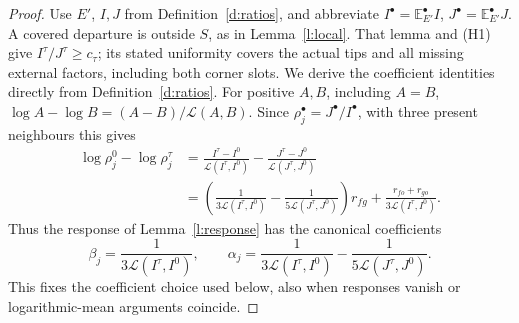 \begin{proof}
Use \(E'\), \(I,J\) from Definition~\ref{d:ratios}, and abbreviate
\(I^\bullet=\mathbb E_{E'}^\bullet I\),
\(J^\bullet=\mathbb E_{E'}^\bullet J\).  A covered departure is
outside \(S\), as in Lemma~\ref{l:local}.  That lemma and (H1)
give \(I^\tau/J^\tau\ge c_\tau\); its stated uniformity covers
the actual tips and all missing external factors, including both
corner slots.  We derive the coefficient identities directly from
Definition~\ref{d:ratios}.  For positive \(A,B\), including
\(A=B\),
\(\log A-\log B=(A-B)/\mathcal L(A,B)\).  Since
\(\rho_j^\bullet=J^\bullet/I^\bullet\), with three present
neighbours this gives
\[
 \begin{split}
 \log\rho_j^0-\log\rho_j^\tau
 &=\frac{I^\tau-I^0}{\mathcal L(I^\tau,I^0)}
       -\frac{J^\tau-J^0}{\mathcal L(J^\tau,J^0)}\\
 &=\left(\frac1{3\mathcal L(I^\tau,I^0)}
            -\frac1{5\mathcal L(J^\tau,J^0)}\right)r_{fg}
       +\frac{r_{fo}+r_{go}}{3\mathcal L(I^\tau,I^0)}.
 \end{split}
\]
Thus the response of Lemma~\ref{l:response} has the canonical
coefficients
\begin{equation}\label{e:rec-typed-coefficients}
 \beta_j=\frac1{3\mathcal L(I^\tau,I^0)},\qquad
 \alpha_j=\frac1{3\mathcal L(I^\tau,I^0)}
                     -\frac1{5\mathcal L(J^\tau,J^0)}.
\end{equation}
This fixes the coefficient choice used below, also when responses
vanish or logarithmic-mean arguments coincide.


\end{proof}
